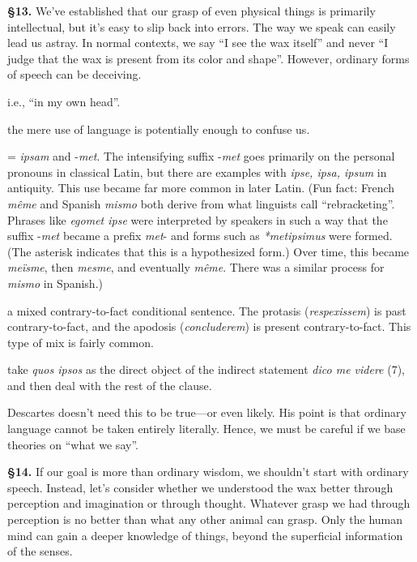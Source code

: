 \prenotes

\textbf{§13.} We've established that our grasp of even physical things is primarily intellectual, but it's easy to slip back into errors. The way we speak can easily lead us astray. In normal contexts, we say ``I see the wax itself'' and never ``I judge that the wax is present from its color and shape''. However, ordinary forms of speech can be deceiving.

 i.e., ``in my own head''.

 the mere use of language is potentially enough to confuse us.

 = \textit{ipsam} and -\textit{met}. The intensifying suffix -\textit{met} goes primarily on the personal pronouns in classical Latin, but there are examples with \textit{ipse, ipsa, ipsum} in antiquity. This use became far more common in later Latin. (Fun fact: French \textit{même} and Spanish \textit{mismo} both derive from what linguists call ``rebracketing''. Phrases like \textit{egomet ipse} were interpreted by speakers in such a way that the suffix -\textit{met} became a prefix \textit{met}- and forms such as \textit{*metipsimus} were formed. (The asterisk indicates that this is a hypothesized form.) Over time, this became \textit{meïsme}, then \textit{mesme}, and eventually \textit{même}. There was a similar process for \textit{mismo} in Spanish.)

 a mixed contrary-to-fact conditional sentence. The protasis (\textit{respexissem}) is past contrary-to-fact, and the apodosis (\textit{concluderem}) is present contrary-to-fact. This type of mix is fairly common.

 take \textit{quos ipsos} as the direct object of the indirect statement \textit{dico me videre} (7), and then deal with the rest of the clause.

 Descartes doesn't need this to be true---or even likely. His point is that ordinary language cannot be taken entirely literally. Hence, we must be careful if we base theories on ``what we say''.

\textbf{§14.} If our goal is more than ordinary wisdom, we shouldn't start with ordinary speech. Instead, let's consider whether we understood the wax better through perception and imagination or through thought. Whatever grasp we had through perception is no better than what any other animal can grasp. Only the human mind can gain a deeper knowledge of things, beyond the superficial information of the senses.

